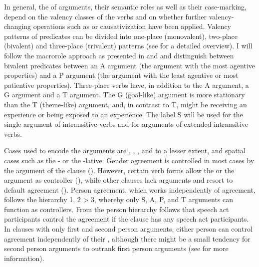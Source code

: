 In general, the  of arguments, their semantic roles as well as their case-mark\-ing, depend on the valency classes of the verbs and on whether further valency-changing operations such as  or causativization have been applied. Valency patterns of predicates can be divided into one-place (monovalent), two-place (bivalent) and three-place (trivalent) patterns (see  for a detailed overview). I will follow the macrorole approach as presented in \citet{Bickel2011} and \citet{Bickel.etal2015} and distinguish between bivalent predicates between an A argument (the argument with the most agentive properties) and a P argument (the argument with the least agentive or most patientive properties). Three-place verbs have, in addition to the A argument, a G argument and a T argument. The G (goal-like) argument is more stationary than the T (theme-like) argument, and, in contrast to T, might be receiving an experience or being exposed to an experience. The label S will be used for the single argument of intransitive verbs and for  arguments of extended intransitive verbs.

Cases used to encode the arguments are , , , and to a lesser extent,  and spatial cases such as the - or the -lative. Gender agreement is controlled in most cases by the  argument of the clause (). However, certain verb forms allow the  or the  argument as controller (), while other clauses lack  arguments and resort to default agreement (). Person agreement, which works  independently of  agreement, follows the hierarchy 1, 2 > 3, whereby only S, A, P, and T arguments can function as controllers. From the person hierarchy follows that speech act participants control the agreement if the clause has any speech act participants. In clauses with only first and second person arguments, either person can control agreement independently of their , although there might be a small tendency for second person arguments to outrank first person arguments (see  for more information).

